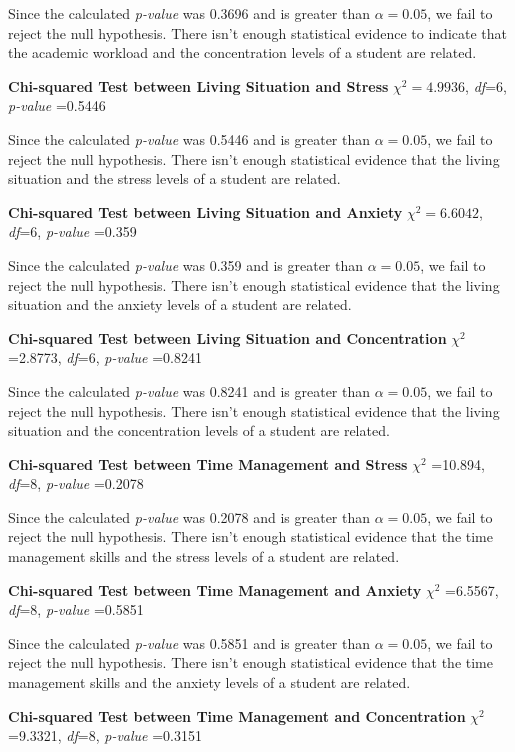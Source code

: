 \documentclass[
  letterpaper,
  DIV=11,
  numbers=noendperiod]{scrartcl}
\begin{document}
Since the calculated \emph{p-value} was 0.3696 and is greater than
\(\alpha = 0.05\), we fail to reject the null hypothesis. There isn't
enough statistical evidence to indicate that the academic workload and
the concentration levels of a student are related.

\textbf{Chi-squared Test between Living Situation and Stress}
\(\chi^2 =4.9936\), \emph{df}=6, \emph{p-value} =0.5446

Since the calculated \emph{p-value} was 0.5446 and is greater than
\(\alpha = 0.05\), we fail to reject the null hypothesis. There isn't
enough statistical evidence that the living situation and the stress
levels of a student are related.

\textbf{Chi-squared Test between Living Situation and Anxiety}
\(\chi^2=6.6042\), \emph{df}=6, \emph{p-value} =0.359

Since the calculated \emph{p-value} was 0.359 and is greater than
\(\alpha=0.05\), we fail to reject the null hypothesis. There isn't
enough statistical evidence that the living situation and the anxiety
levels of a student are related.

\textbf{Chi-squared Test between Living Situation and Concentration}
\(\chi^2\) =2.8773, \emph{df}=6, \emph{p-value} =0.8241

Since the calculated \emph{p-value} was 0.8241 and is greater than
\(\alpha=0.05\), we fail to reject the null hypothesis. There isn't
enough statistical evidence that the living situation and the
concentration levels of a student are related.

\textbf{Chi-squared Test between Time Management and Stress} \(\chi^2\)
=10.894, \emph{df}=8, \emph{p-value} =0.2078

Since the calculated \emph{p-value} was 0.2078 and is greater than
\(\alpha=0.05\), we fail to reject the null hypothesis. There isn't
enough statistical evidence that the time management skills and the
stress levels of a student are related.

\textbf{Chi-squared Test between Time Management and Anxiety} \(\chi^2\)
=6.5567, \emph{df}=8, \emph{p-value} =0.5851

Since the calculated \emph{p-value} was 0.5851 and is greater than
\(\alpha=0.05\), we fail to reject the null hypothesis. There isn't
enough statistical evidence that the time management skills and the
anxiety levels of a student are related.

\textbf{Chi-squared Test between Time Management and Concentration}
\(\chi^2\) =9.3321, \emph{df}=8, \emph{p-value} =0.3151
\end{document}
